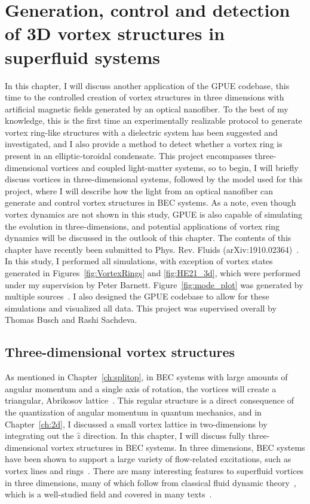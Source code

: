 \chapter{Generation, control and detection of 3D vortex structures in superfluid systems}
\label{ch:vortex_states}

In this chapter, I will discuss another application of the GPUE codebase, this time to the controlled creation of vortex structures in three dimensions with artificial magnetic fields generated by an optical nanofiber.
To the best of my knowledge, this is the first time an experimentally realizable protocol to generate vortex ring-like structures with a dielectric system has been suggested and investigated, and I also provide a method to detect whether a vortex ring is present in an elliptic-toroidal condensate.
This project encompasses three-dimensional vortices and coupled light-matter systems, so to begin, I will briefly discuss vortices in three-dimensional systems, followed by the model used for this project, where I will describe how the light from an optical nanofiber can generate and control vortex structures in BEC systems.
As a note, even though vortex dynamics are not shown in this study, GPUE is also capable of simulating the evolution in three-dimensions, and potential applications of vortex ring dynamics will be discussed in the outlook of this chapter.
The contents of this chapter have recently been submitted to Phys. Rev. Fluids (arXiv:1910.02364)~\cite{schloss2019}.
In this study, I performed all simulations, with exception of vortex states generated in Figures~\ref{fig:VortexRings} and \ref{fig:HE21_3d}, which were performed under my supervision by Peter Barnett.
Figure~\ref{fig:mode_plot} was generated by multiple sources~\cite{nieddu2016, kumar2015}.
I also designed the GPUE codebase to allow for these simulations and visualized all data.
This project was supervised overall by Thomas Busch and Rashi Sachdeva.


\section{Three-dimensional vortex structures}
\label{sec:vortex}

As mentioned in Chapter~\ref{ch:splitop}, in BEC systems with large amounts of angular momentum and a single axis of rotation, the vortices will create a triangular, Abrikosov lattice~\cite{abo2001, abrikosov1957}. 
This regular structure is a direct consequence of the quantization of angular momentum in quantum mechanics, and in Chapter~\ref{ch:2d}, I discussed a small vortex lattice in two-dimensions by integrating out the $\hat z$ direction.
In this chapter, I will discuss fully three-dimensional vortex structures in BEC systems. 
In three dimensions, BEC systems have been shown to support a large variety of flow-related excitations, such as vortex lines and rings~\cite{madison2000,abo2001, wacks2014, anderson2001, bulgac2014, ku2016, matthews1999, yefsah2013}.
There are many interesting features to superfluid vortices in three dimensions, many of which follow from classical fluid dynamic theory~\cite{fetter2009}, which is a well-studied field and covered in many texts~\cite{faber1995, kundu2012, tritton1988, landau1987}.

